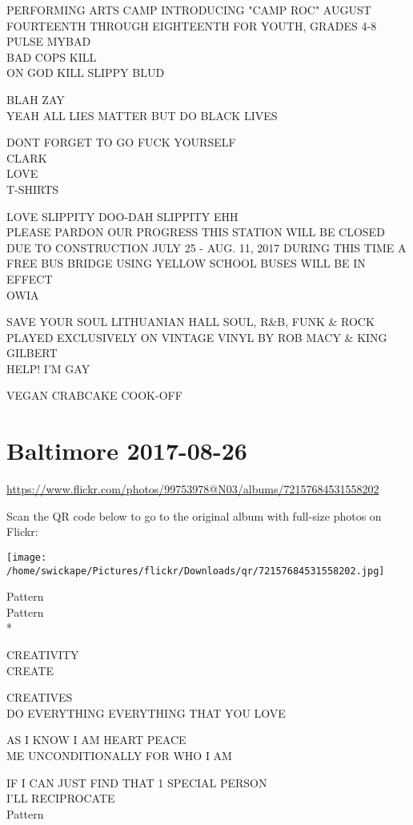 \documentclass[10pt,letterpaper]{article}
\begin{document}
PERFORMING ARTS CAMP INTRODUCING "CAMP ROC" AUGUST FOURTEENTH THROUGH EIGHTEENTH FOR YOUTH, GRADES 4{-}8\\
PULSE MYBAD\\
BAD COPS KILL\\
ON GOD KILL SLIPPY BLUD

BLAH ZAY\\
YEAH ALL LIES MATTER BUT DO BLACK LIVES

DONT FORGET TO GO FUCK YOURSELF\\
CLARK\\
LOVE\\
T{-}SHIRTS

LOVE SLIPPITY DOO{-}DAH SLIPPITY EHH\\
PLEASE PARDON OUR PROGRESS THIS STATION WILL BE CLOSED DUE TO CONSTRUCTION JULY 25 {-} AUG. 11, 2017 DURING THIS TIME A FREE BUS BRIDGE USING YELLOW SCHOOL BUSES WILL BE IN EFFECT\\
OWIA

SAVE YOUR SOUL LITHUANIAN HALL SOUL, R\&B, FUNK \& ROCK PLAYED EXCLUSIVELY ON VINTAGE VINYL BY ROB MACY \& KING GILBERT\\
HELP!  I'M GAY

VEGAN CRABCAKE COOK{-}OFF


\section*{Baltimore 2017-08-26}

\url{https://www.flickr.com/photos/99753978@N03/albums/72157684531558202}

Scan the QR code below to go to the original album with full-size photos on Flickr:

\texttt{[image: /home/swickape/Pictures/flickr/Downloads/qr/72157684531558202.jpg]}


Pattern\\
Pattern\\
*

CREATIVITY\\
CREATE

CREATIVES\\
DO EVERYTHING EVERYTHING THAT YOU LOVE

AS I KNOW I AM HEART PEACE\\
ME UNCONDITIONALLY FOR WHO I AM

IF I CAN JUST FIND THAT 1 SPECIAL PERSON\\
I'LL RECIPROCATE\\
Pattern
\end{document}
